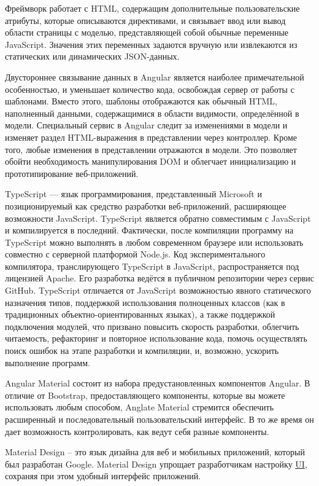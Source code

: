 Фреймворк работает с HTML, содержащим дополнительные пользовательские атрибуты, которые описываются директивами, и связывает ввод или вывод области страницы с моделью, представляющей собой обычные переменные JavaScript.
Значения этих переменных задаются вручную или извлекаются из статических или динамических JSON-данных.

Двустороннее связывание данных в Angular является наиболее примечательной особенностью, и уменьшает количество кода, освобождая сервер от работы с шаблонами.
Вместо этого, шаблоны отображаются как обычный HTML, наполненный данными, содержащимися в области видимости, определённой в модели.
Специальный сервис в Angular следит за изменениями в модели и изменяет раздел HTML-выражения в представлении через контроллер.
Кроме того, любые изменения в представлении отражаются в модели.
Это позволяет обойти необходимость манипулирования DOM и облегчает инициализацию и прототипирование веб-приложений.\cite{web-angular}

TypeScript — язык программирования, представленный Microsoft и позиционируемый как средство разработки веб-приложений, расширяющее возможности JavaScript.
TypeScript является обратно совместимым с JavaScript и компилируется в последний.
Фактически, после компиляции программу на TypeScript можно выполнять в любом современном браузере или использовать совместно с серверной платформой Node.js.
Код экспериментального компилятора, транслирующего TypeScript в JavaScript, распространяется под лицензией Apache.
Его разработка ведётся в публичном репозитории через сервис GitHub.
TypeScript отличается от JavaScript возможностью явного статического назначения типов, поддержкой использования полноценных классов (как в традиционных объектно-ориентированных языках), а также поддержкой подключения модулей, что призвано повысить скорость разработки, облегчить читаемость, рефакторинг и повторное использование кода, помочь осуществлять поиск ошибок на этапе разработки и компиляции, и, возможно, ускорить выполнение программ.\cite{web-typescript}

Angular Material состоит из набора предустановленных компонентов Angular.
В отличие от Bootstrap, предоставляющего компоненты, которые вы можете использовать любым способом, Anglate Material стремится обеспечить расширенный и последовательный пользовательский интерфейс.
В то же время он дает возможность контролировать, как ведут себя разные компоненты.

Material Design – это язык дизайна для веб и мобильных приложений, который был разработан Google.
Material Design упрощает разработчикам настройку \hyperlink{gloss:ui}{UI}, сохраняя при этом удобный интерфейс приложений.

